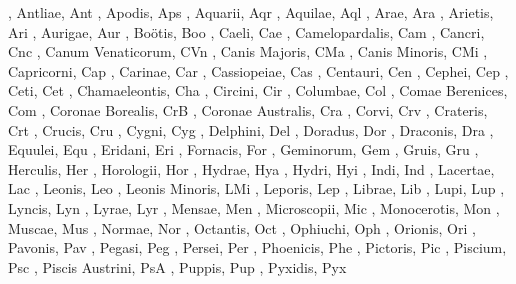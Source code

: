 , Antliae, Ant
, Apodis, Aps
, Aquarii, Aqr
, Aquilae, Aql
, Arae, Ara
, Arietis, Ari
, Aurigae, Aur
, Bo{\"o}tis, Boo
, Caeli, Cae
, Camelopardalis, Cam
, Cancri, Cnc
, Canum Venaticorum, CVn
, Canis Majoris, CMa
, Canis Minoris, CMi
, Capricorni, Cap
, Carinae, Car
, Cassiopeiae, Cas
, Centauri, Cen
, Cephei, Cep
, Ceti, Cet
, Chamaeleontis, Cha
, Circini, Cir
, Columbae, Col
, Comae Berenices, Com
, Coronae Borealis, CrB
, Coronae Australis, Cra
, Corvi, Crv
, Crateris, Crt
, Crucis, Cru
, Cygni, Cyg
, Delphini, Del
, Doradus, Dor
, Draconis, Dra
, Equulei, Equ
, Eridani, Eri
, Fornacis, For
, Geminorum, Gem
, Gruis, Gru
, Herculis, Her
, Horologii, Hor
, Hydrae, Hya
, Hydri, Hyi
, Indi, Ind
, Lacertae, Lac
, Leonis, Leo
, Leonis Minoris, LMi
, Leporis, Lep
, Librae, Lib
, Lupi, Lup
, Lyncis, Lyn
, Lyrae, Lyr
, Mensae, Men
, Microscopii, Mic
, Monocerotis, Mon
, Muscae, Mus
, Normae, Nor
, Octantis, Oct
, Ophiuchi, Oph
, Orionis, Ori
, Pavonis, Pav
, Pegasi, Peg
, Persei, Per
, Phoenicis, Phe
, Pictoris, Pic
, Piscium, Psc
, Piscis Austrini, PsA
, Puppis, Pup
, Pyxidis, Pyx
